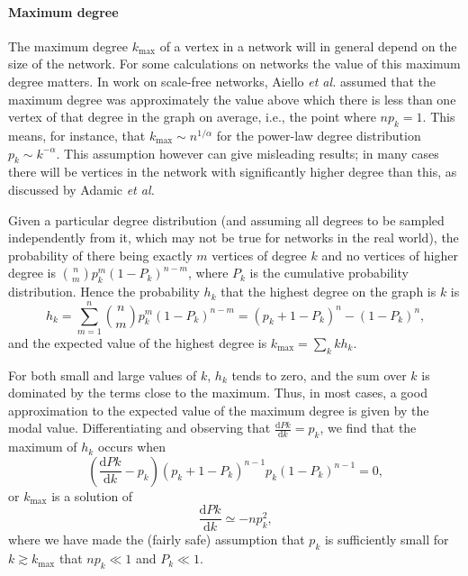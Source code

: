       \paragraph{Maximum degree}
      
        The maximum degree $k_{\mbox{max}}$ of a vertex in a network will in general depend on the size of the network. For some calculations on networks the value of this maximum degree matters. In work on scale-free networks, Aiello \textit{et al.}\cite{AielloChungLu2000} assumed that the maximum degree was approximately the value above which there is less than one vertex of that degree in the graph on average, i.e., the point where $np_k = 1$. This means, for instance, that $k_{\mbox{max}} \sim n^{1/\alpha}$ for the power-law degree distribution $p_k \sim k^{−\alpha}$. This assumption however can give misleading results; in many cases there will be vertices in the network with significantly higher degree than this, as discussed by Adamic \textit{et al.}\cite{AdamicLukosePuniyaniHuberman2001}
        
        Given a particular degree distribution (and assuming all degrees to be sampled independently from it, which may not be true for networks in the real world), the probability of there being exactly $m$ vertices of degree $k$ and no vertices of higher degree is $\binom{n}{m} p^m_k (1 − P_k)^{n−m}$, where $P_k$ is the cumulative probability distribution. Hence the probability $h_k$ that the highest degree on the graph is $k$ is
        \begin{equation}
          h_k = \sum_{m=1}^n \binom{n}{m} p^m_k (1 - P_k)^{n-m} = (p_k + 1 - P_k)^n - (1 - P_k)^n\mbox{,}
        \end{equation}
        and the expected value of the highest degree is $k_{\mbox{max}} = \sum_k kh_k$.
        
        For both small and large values of $k$, $h_k$ tends to zero, and the sum over $k$ is dominated by the terms close to the maximum. Thus, in most cases, a good approximation to the expected value of the maximum degree is given by the modal value. Differentiating and observing that $\frac{\mbox{d}Pk}{\mbox{d}k} = p_k$, we find that the maximum of $h_k$ occurs when
        \begin{equation}
          \left(\frac{\mbox{d}Pk}{\mbox{d}k} - p_k\right)(p_k + 1 - P_k)^{n-1} p_k(1 - P_k)^{n-1} = 0\mbox{,}
        \end{equation}
        or $k_{\mbox{max}}$ is a solution of
        \begin{equation}
          \frac{\mbox{d}Pk}{\mbox{d}k} \simeq -np^2_k\mbox{,}
        \end{equation}
        where we have made the (fairly safe) assumption that $p_k$ is sufficiently small for $k \gtrsim k_{\mbox{max}}$ that $np_k \ll 1$ and $P_k \ll 1$.
        
